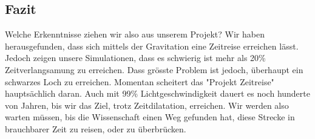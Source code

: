 \begin{refsection}
	
	
	
	
	\section{Fazit}
	
	Welche Erkenntnisse ziehen wir also aus unserem Projekt?
	Wir haben herausgefunden, dass sich mittels der Gravitation eine Zeitreise erreichen lässt. Jedoch zeigen unsere Simulationen, dass es schwierig ist mehr als 20\% Zeitverlangsamung zu erreichen. Dass grösste Problem ist jedoch, überhaupt ein schwarzes Loch zu erreichen. Momentan scheitert das "Projekt Zeitreise" hauptsächlich daran. Auch mit 99\% Lichtgeschwindigkeit dauert es noch hunderte von Jahren, bis wir das Ziel, trotz Zeitdilatation, erreichen. Wir werden also warten müssen, bis die Wissenschaft einen Weg gefunden hat, diese Strecke in brauchbarer Zeit zu reisen, oder zu überbrücken. %
	


	\printbibliography[heading=subbibliography]
	\end{refsection}

